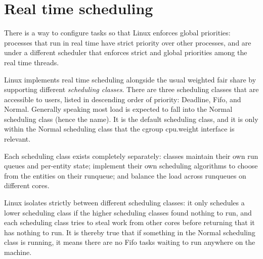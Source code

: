 
\section{Real time scheduling}
\label{sec:sched-rt}

There is a way to configure tasks so that Linux enforces global priorities:
processes that run in real time have strict priority over other processes, and
are under a different scheduler that enforces strict and global priorities among
the real time threads.

Linux implements real time scheduling alongside the usual weighted fair share by
supporting different \textit{scheduling classes}. There are three scheduling
classes that are accessible to users, listed in descending order of priority:
Deadline, Fifo, and Normal. Generally speaking most load is expected to fall
into the Normal scheduling class (hence the name). It is the default scheduling
class, and it is only within the Normal scheduling class that the cgroup
cpu.weight interface is relevant.

Each scheduling class exists completely separately: classes maintain their own
run queues and per-entity state; implement their own scheduling algorithms to
choose from the entities on their runqueue; and balance the load across
runqueues on different cores.

Linux isolates strictly between different scheduling classes: it only schedules
a lower scheduling class if the higher scheduling classes found nothing to run,
and each scheduling class tries to steal work from other cores before returning
that it has nothing to run. It is thereby true that if something in the Normal
scheduling class is running, it means there are no Fifo tasks waiting to run
anywhere on the machine.

